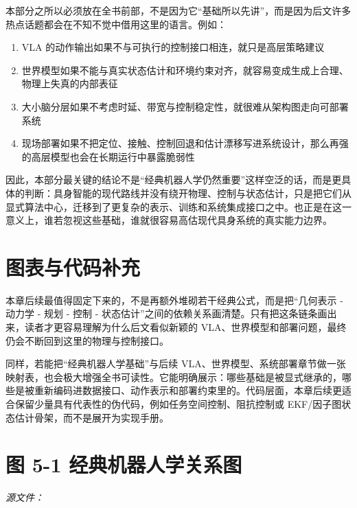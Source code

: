 本部分之所以必须放在全书前部，不是因为它“基础所以先讲”，而是因为后文许多热点话题都会在不知不觉中借用这里的语言。例如：

\begin{enumerate}
\item VLA 的动作输出如果不与可执行的控制接口相连，就只是高层策略建议
\item 世界模型如果不能与真实状态估计和环境约束对齐，就容易变成生成上合理、物理上失真的内部表征
\item 大小脑分层如果不考虑时延、带宽与控制稳定性，就很难从架构图走向可部署系统
\item 现场部署如果不把定位、接触、控制回退和估计漂移写进系统设计，那么再强的高层模型也会在长期运行中暴露脆弱性
\end{enumerate}

因此，本部分最关键的结论不是“经典机器人学仍然重要”这样空泛的话，而是更具体的判断：具身智能的现代路线并没有绕开物理、控制与状态估计，只是把它们从显式算法中心，迁移到了更复杂的表示、训练和系统集成接口之中。也正是在这一意义上，谁若忽视这些基础，谁就很容易高估现代具身系统的真实能力边界。

\section*{图表与代码补充}

本章后续最值得固定下来的，不是再额外堆砌若干经典公式，而是把“几何表示 - 动力学 - 规划 - 控制 - 状态估计”之间的依赖关系画清楚。只有把这条链条画出来，读者才更容易理解为什么后文看似新颖的 VLA、世界模型和部署问题，最终仍会不断回到这里的物理与控制接口。

同样，若能把“经典机器人学基础”与后续 VLA、世界模型、系统部署章节做一张映射表，也会极大增强全书可读性。它能明确展示：哪些基础是被显式继承的，哪些是被重新编码进数据接口、动作表示和部署约束里的。代码层面，本章后续更适合保留少量具有代表性的伪代码，例如任务空间控制、阻抗控制或 EKF/因子图状态估计骨架，而不是展开为实现手册。

\section*{图 5-1 经典机器人学关系图}

\noindent\textit{源文件：\texttt{}}

